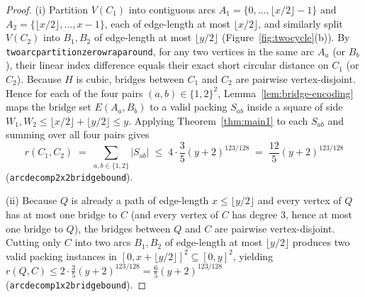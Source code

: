 \documentclass[11pt,reqno]{amsart}
\theoremstyle{plain}
\theoremstyle{definition}
\theoremstyle{remark}
\DeclareRobustCommand{\_}{\ifmmode\text{\textunderscore}\else\textunderscore\allowbreak\fi}
\begin{document}
\begin{proof}
(i) Partition $V(C_1)$ into contiguous arcs $A_1 = \{0, \dots, \lfloor x/2 \rfloor - 1\}$ and $A_2 = \{\lfloor x/2 \rfloor, \dots, x - 1\}$, each of edge-length at most $\lfloor x/2 \rfloor$, and similarly split $V(C_2)$ into $B_1, B_2$ of edge-length at most $\lfloor y/2 \rfloor$ (Figure~\ref{fig:twocycle}(b)). By \texttt{two\_arc\_partition\_zero\_wraparound}, for any two vertices in the same arc $A_a$ (or $B_b$), their linear index difference equals their exact short circular distance on $C_1$ (or $C_2$). Because $H$ is cubic, bridges between $C_1$ and $C_2$ are pairwise vertex-disjoint. Hence for each of the four pairs $(a, b) \in \{1, 2\}^2$, Lemma~\ref{lem:bridge-encoding} maps the bridge set $E(A_a, B_b)$ to a valid packing $S_{ab}$ inside a square of side $W_1, W_2 \le \lfloor x/2 \rfloor + \lfloor y/2 \rfloor \le y$. Applying Theorem~\ref{thm:main1} to each $S_{ab}$ and summing over all four pairs gives
\[
  r(C_1, C_2) \;=\; \sum_{a, b \in \{1, 2\}} |S_{ab}| \;\le\; 4 \cdot \frac{3}{5}(y + 2)^{123/128} \;=\; \frac{12}{5}(y + 2)^{123/128}
\]
(\texttt{arc\_decomp\_2x2\_bridge\_bound}).

(ii) Because $Q$ is already a path of edge-length $x \le \lfloor y/2 \rfloor$ and every vertex of $Q$ has at most one bridge to $C$ (and every vertex of $C$ has degree $3$, hence at most one bridge to $Q$), the bridges between $Q$ and $C$ are pairwise vertex-disjoint. Cutting only $C$ into two arcs $B_1, B_2$ of edge-length at most $\lfloor y/2 \rfloor$ produces two valid packing instances in $[0, x + \lfloor y/2 \rfloor]^2 \subseteq [0, y]^2$, yielding $r(Q, C) \le 2 \cdot \frac{3}{5}(y + 2)^{123/128} = \frac{6}{5}(y + 2)^{123/128}$ (\texttt{arc\_decomp\_1x2\_bridge\_bound}).
\end{proof}
\end{document}
